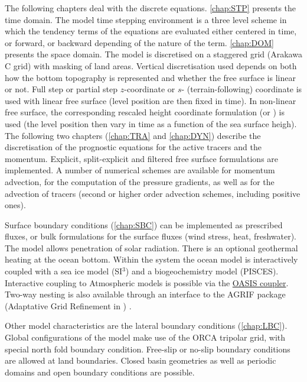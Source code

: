 \documentclass[../main/NEMO_manual]{subfiles}
\begin{document}
The following chapters deal with the discrete equations.
\autoref{chap:STP} presents the time domain.
The model time stepping environment is a three level scheme in which 
the tendency terms of the equations are evaluated either centered in time, or forward, or backward depending of 
the nature of the term.
\autoref{chap:DOM} presents the space domain.
The model is discretised on a staggered grid (Arakawa C grid) with masking of land areas.
Vertical discretisation used depends on both how the bottom topography is represented and whether 
the free surface is linear or not.
Full step or partial step $z$-coordinate or $s$- (terrain-following) coordinate is used with linear free surface 
(level position are then fixed in time).
In non-linear free surface, the corresponding rescaled height coordinate formulation (\zstar or \sstar) is used
(the level position then vary in time as a function of the sea surface heigh).
The following two chapters (\autoref{chap:TRA} and \autoref{chap:DYN}) describe the discretisation of
the prognostic equations for the active tracers and the momentum.
Explicit, split-explicit and filtered free surface formulations are implemented.
A number of numerical schemes are available for momentum advection, 
for the computation of the pressure gradients, as well as for the advection of tracers 
(second or higher order advection schemes, including positive ones).

Surface boundary conditions (\autoref{chap:SBC}) can be implemented as prescribed fluxes, or bulk formulations for 
the surface fluxes (wind stress, heat, freshwater).
The model allows penetration of solar radiation.
There is an optional geothermal heating at the ocean bottom.
Within the \NEMO system the ocean model is interactively coupled with a sea ice model (SI$^3$) and
a biogeochemistry model (PISCES).
Interactive coupling to Atmospheric models is possible via the \href{https://portal.enes.org/oasis}{OASIS coupler}.
Two-way nesting is also available through an interface to the AGRIF package
(Adaptative Grid Refinement in \fortran) \citep{debreu.vouland.ea_CG08}.

Other model characteristics are the lateral boundary conditions (\autoref{chap:LBC}).
Global configurations of the model make use of the ORCA tripolar grid, with special north fold boundary condition.
Free-slip or no-slip boundary conditions are allowed at land boundaries.
Closed basin geometries as well as periodic domains and open boundary conditions are possible.
\end{document}
